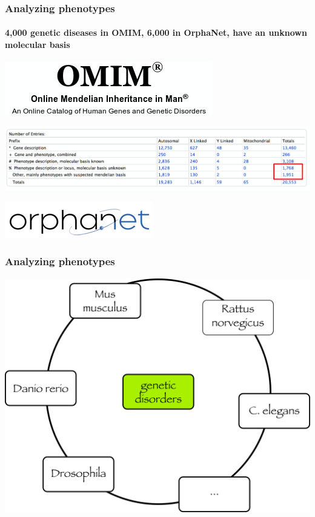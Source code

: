 \documentclass{beamer}
\begin{document}
\begin{frame}
  \frametitle{Analyzing phenotypes}
  \framesubtitle{4,000 genetic diseases in OMIM, 6,000 in OrphaNet,
    have an unknown molecular basis}
  \centerline{\includegraphics[width=.5\textwidth]{omim-s.png}}
  \centerline{\includegraphics[width=1\textwidth]{omim_highlight.png}}
  \centerline{\includegraphics[width=.5\textwidth]{orphanet-logo.png}}
\end{frame}

\begin{frame}
  \frametitle{Analyzing phenotypes}
  \centerline{\includegraphics[width=.8\textwidth]{circle.png}}
\end{frame}
\end{document}
